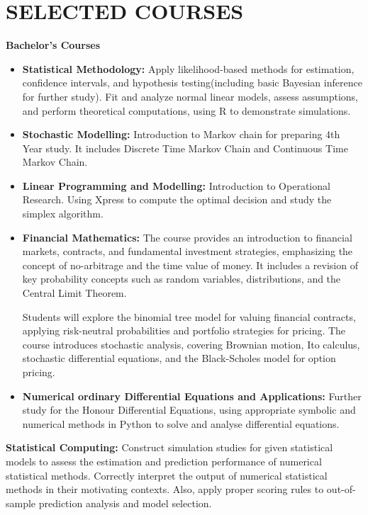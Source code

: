 \documentclass[a4paper,9pt]{extarticle}
\begin{document}
\section*{SELECTED COURSES}
\noindent
\textbf{Bachelor's Courses}
\begin{itemize}
\item \textbf{Statistical Methodology:} Apply likelihood-based methods for estimation, confidence intervals, and hypothesis testing(including basic Bayesian inference for further study). Fit and analyze normal linear models, assess assumptions, and perform theoretical computations, using R to demonstrate simulations.

\item \textbf{Stochastic Modelling:}  Introduction to Markov chain for preparing 4th Year study. It includes Discrete Time Markov Chain and Continuous Time Markov Chain.

\item \textbf{Linear Programming and Modelling:} Introduction to Operational Research. Using Xpress to compute the optimal decision and study the simplex algorithm.

\item \textbf{Financial Mathematics:} The course provides an introduction to financial markets, contracts, and fundamental investment strategies, emphasizing the concept of no-arbitrage and the time value of money. It includes a revision of key probability concepts such as random variables, distributions, and the Central Limit Theorem.

Students will explore the binomial tree model for valuing financial contracts, applying risk-neutral probabilities and portfolio strategies for pricing. The course introduces stochastic analysis, covering Brownian motion, Ito calculus, stochastic differential equations, and the Black-Scholes model for option pricing.

\item \textbf{Numerical ordinary Differential Equations and Applications:} Further study for the Honour Differential Equations, using appropriate symbolic and numerical methods in Python to solve and analyse differential equations. 
\end{itemize}

\item\textbf{Statistical Computing:}
Construct simulation studies for given statistical models to assess the estimation and prediction performance of numerical statistical methods. Correctly interpret the output of numerical statistical methods in their motivating contexts. Also, apply proper scoring rules to out-of-sample prediction analysis and model selection.
\end{document}
